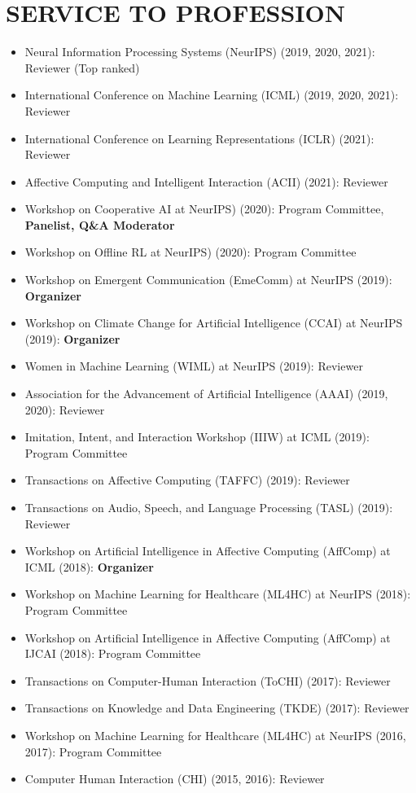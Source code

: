 \documentclass[paper=letter,fontsize=11pt]{scrartcl} %
\newcommand{\NewPart}[2]{\section*{\uppercase{#1} #2}}
\newcommand{\CommitteeEntry}[3]{
		\noindent #1 (#2): #3}
\begin{document}
\NewPart{Service to Profession}{}
\begin{itemize}
    \item \CommitteeEntry{Neural Information Processing Systems (NeurIPS)}{2019, 2020, 2021}{Reviewer (Top ranked)}
    \item \CommitteeEntry{International Conference on Machine Learning (ICML)}{2019, 2020, 2021}{Reviewer}
    \item \CommitteeEntry{International Conference on Learning Representations (ICLR)}{2021}{Reviewer}
    \item \CommitteeEntry{Affective Computing and Intelligent Interaction (ACII)}{2021}{Reviewer}
    \item \CommitteeEntry{Workshop on Cooperative AI at NeurIPS)}{2020}{Program Committee, \textbf{Panelist, Q\&A Moderator}}
    \item \CommitteeEntry{Workshop on Offline RL at NeurIPS)}{2020}{Program Committee}
    \item \CommitteeEntry{Workshop on Emergent Communication (EmeComm) at NeurIPS}{2019}{\textbf{Organizer}}
    \item \CommitteeEntry{Workshop on Climate Change for Artificial Intelligence (CCAI) at NeurIPS}{2019}{\textbf{Organizer}}
    \item \CommitteeEntry{Women in Machine Learning (WIML) at NeurIPS}{2019}{Reviewer}
    \item \CommitteeEntry{Association for the Advancement of Artificial Intelligence (AAAI)}{2019, 2020}{Reviewer}
    \item \CommitteeEntry{Imitation, Intent, and Interaction Workshop (IIIW) at ICML}{2019}{Program Committee}
    \item \CommitteeEntry{Transactions on Affective Computing (TAFFC)}{2019}{Reviewer}
    \item \CommitteeEntry{Transactions on Audio, Speech, and Language Processing (TASL)}{2019}{Reviewer}
    \item \CommitteeEntry{Workshop on Artificial Intelligence in Affective Computing (AffComp) at ICML}{2018}{\textbf{Organizer}}
    \item \CommitteeEntry{Workshop on Machine Learning for Healthcare (ML4HC) at NeurIPS}{2018}{Program Committee}
    \item \CommitteeEntry{Workshop on Artificial Intelligence in Affective Computing (AffComp) at IJCAI}{2018}{Program Committee}
    \item \CommitteeEntry{Transactions on Computer-Human Interaction (ToCHI)}{2017}{Reviewer}
    \item \CommitteeEntry{Transactions on Knowledge and Data Engineering (TKDE)}{2017}{Reviewer}
    \item \CommitteeEntry{Workshop on Machine Learning for Healthcare (ML4HC) at NeurIPS}{2016, 2017}{Program Committee}
    \item \CommitteeEntry{Computer Human Interaction (CHI)}{2015, 2016}{Reviewer}

\end{itemize}
\end{document}
